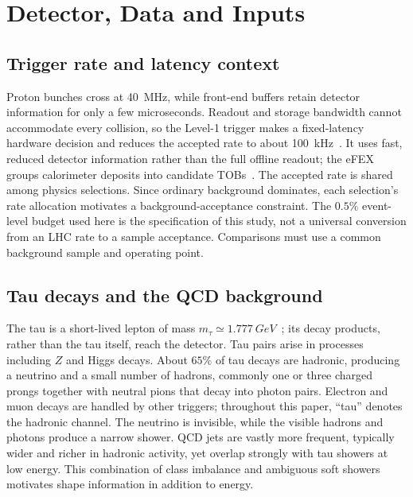 \section{Detector, Data and Inputs}
\label{app:data}

\subsection{Trigger rate and latency context}
\label{app:trigger_context}
Proton bunches cross at \SI{40}{MHz}, while front-end buffers retain detector information for only a few microseconds. Readout and storage bandwidth cannot accommodate every collision, so the Level-1 trigger makes a fixed-latency hardware decision and reduces the accepted rate to about \SI{100}{kHz}~\cite{atlas_trigger_run3}. It uses fast, reduced detector information rather than the full offline readout; the eFEX groups calorimeter deposits into candidate TOBs~\cite{atlas_phase1_tdr}. The accepted rate is shared among physics selections. Since ordinary background dominates, each selection's rate allocation motivates a background-acceptance constraint. The $0.5\%$ event-level budget used here is the specification of this study, not a universal conversion from an LHC rate to a sample acceptance. Comparisons must use a common background sample and operating point.

\subsection{Tau decays and the QCD background}
\label{app:tau_context}
The tau is a short-lived lepton of mass $m_\tau\simeq\SI{1.777}{GeV}$~\cite{pdg2024}; its decay products, rather than the tau itself, reach the detector. Tau pairs arise in processes including $Z$ and Higgs decays. About $65\%$ of tau decays are hadronic, producing a neutrino and a small number of hadrons, commonly one or three charged prongs together with neutral pions that decay into photon pairs. Electron and muon decays are handled by other triggers; throughout this paper, ``tau'' denotes the hadronic channel. The neutrino is invisible, while the visible hadrons and photons produce a narrow shower. QCD jets are vastly more frequent, typically wider and richer in hadronic activity, yet overlap strongly with tau showers at low energy. This combination of class imbalance and ambiguous soft showers motivates shape information in addition to energy.

